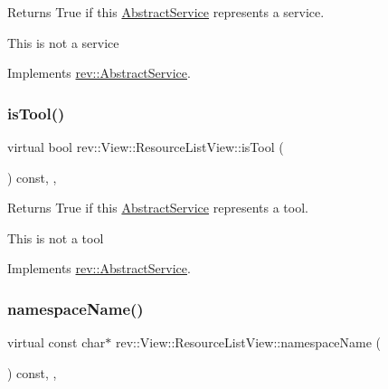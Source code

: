 Returns True if this \mbox{\hyperlink{classrev_1_1_abstract_service}{Abstract\+Service}} represents a service. 

This is not a service 

Implements \mbox{\hyperlink{classrev_1_1_abstract_service_a2ee1ad1b9d10a1d702d0a484e214b99d}{rev\+::\+Abstract\+Service}}.

\mbox{\label{classrev_1_1_view_1_1_resource_list_view_a9a2dd9e4b97e4018bd44f0f26c695906}} 
\subsubsection{\texorpdfstring{isTool()}{isTool()}}
{\footnotesize\ttfamily virtual bool rev\+::\+View\+::\+Resource\+List\+View\+::is\+Tool (\begin{DoxyParamCaption}{ }\end{DoxyParamCaption}) const\hspace{0.3cm}{\ttfamily [inline]}, {\ttfamily [override]}, {\ttfamily [virtual]}}



Returns True if this \mbox{\hyperlink{classrev_1_1_abstract_service}{Abstract\+Service}} represents a tool. 

This is not a tool 

Implements \mbox{\hyperlink{classrev_1_1_abstract_service_aeb245a6d33601ccb842f4c7c2a3dda7a}{rev\+::\+Abstract\+Service}}.

\mbox{\label{classrev_1_1_view_1_1_resource_list_view_a58c6e30384ae07c1de6fe33efd9c0eb3}} 
\subsubsection{\texorpdfstring{namespaceName()}{namespaceName()}}
{\footnotesize\ttfamily virtual const char$\ast$ rev\+::\+View\+::\+Resource\+List\+View\+::namespace\+Name (\begin{DoxyParamCaption}{ }\end{DoxyParamCaption}) const\hspace{0.3cm}{\ttfamily [inline]}, {\ttfamily [override]}, {\ttfamily [virtual]}}



